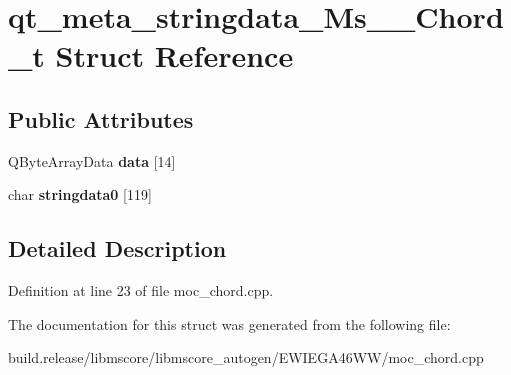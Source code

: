 \hypertarget{structqt__meta__stringdata___ms_____chord__t}{}\section{qt\+\_\+meta\+\_\+stringdata\+\_\+\+Ms\+\_\+\+\_\+\+Chord\+\_\+t Struct Reference}
\label{structqt__meta__stringdata___ms_____chord__t}
\subsection*{Public Attributes}
\begin{DoxyCompactItemize}
\item 
\mbox{\label{structqt__meta__stringdata___ms_____chord__t_ac502b1846f417ccab52992562ed61d55}} 
Q\+Byte\+Array\+Data {\bfseries data} \mbox{[}14\mbox{]}
\item 
\mbox{\label{structqt__meta__stringdata___ms_____chord__t_ad30173f0a83f40a6caebae69d979c2a0}} 
char {\bfseries stringdata0} \mbox{[}119\mbox{]}
\end{DoxyCompactItemize}


\subsection{Detailed Description}


Definition at line 23 of file moc\+\_\+chord.\+cpp.



The documentation for this struct was generated from the following file\+:\begin{DoxyCompactItemize}
\item 
build.\+release/libmscore/libmscore\+\_\+autogen/\+E\+W\+I\+E\+G\+A46\+W\+W/moc\+\_\+chord.\+cpp\end{DoxyCompactItemize}
